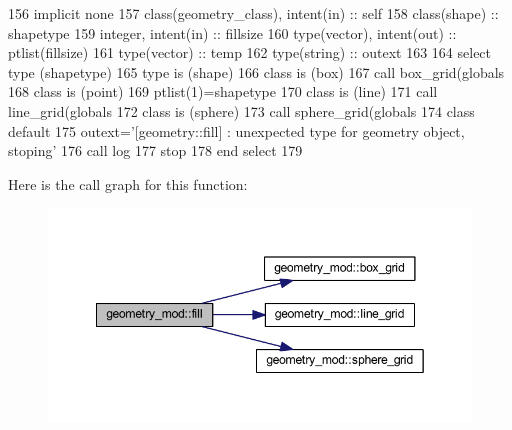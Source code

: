 \begin{DoxyCode}
156     \textcolor{keywordtype}{implicit none}
157     \textcolor{keywordtype}{class}(geometry\_class), \textcolor{keywordtype}{intent(in)} :: self
158     \textcolor{keywordtype}{class}(shape) :: shapetype
159     \textcolor{keywordtype}{integer}, \textcolor{keywordtype}{intent(in)} :: fillsize
160     \textcolor{keywordtype}{type}(vector), \textcolor{keywordtype}{intent(out)} :: ptlist(fillsize)
161     \textcolor{keywordtype}{type}(vector) :: temp
162     \textcolor{keywordtype}{type}(string) :: outext
163 
164     \textcolor{keywordflow}{select type} (shapetype)
165 \textcolor{keywordflow}{    type is} (shape)
166 \textcolor{keywordflow}{    class is} (box)
167         \textcolor{keyword}{call }box\_grid(globals%
168 \textcolor{keywordflow}{    class is} (point)
169         ptlist(1)=shapetype%
170 \textcolor{keywordflow}{    class is} (line)
171         \textcolor{keyword}{call }line\_grid(globals%
172 \textcolor{keywordflow}{    class is} (sphere)
173         \textcolor{keyword}{call }sphere\_grid(globals%
174 \textcolor{keywordflow}{        class default}
175         outext=\textcolor{stringliteral}{'[geometry::fill] : unexpected type for geometry object, stoping'}
176         \textcolor{keyword}{call }log%
177         stop
178 \textcolor{keywordflow}{    end select}
179 
\end{DoxyCode}
Here is the call graph for this function\+:\nopagebreak
\begin{figure}[H]
\begin{center}
\leavevmode
\includegraphics[width=349pt]{namespacegeometry__mod_a095a8b47b3c23e154dcd31ab1441a065_cgraph}
\end{center}
\end{figure}
\mbox{\label{namespacegeometry__mod_a92602e1198d3607613ea2722fb002685}} 
